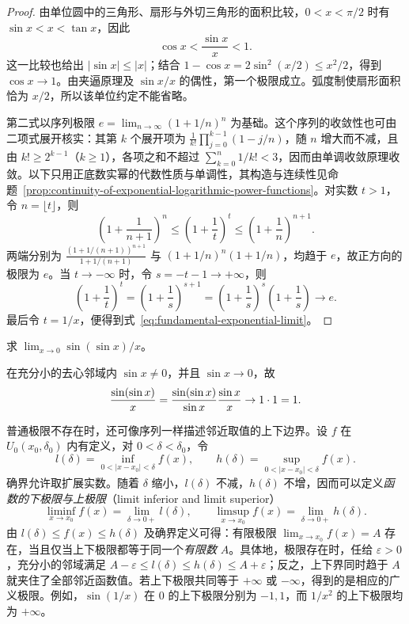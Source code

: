 \documentclass[UTF8,12pt,a4paper,fontset=fandol]{ctexbook}
\begin{document}
\begin{proof}
由单位圆中的三角形、扇形与外切三角形的面积比较，$0<x<\pi/2$ 时有 $\sin x<x<\tan x$，因此
\[
    \cos x<\frac{\sin x}{x}<1.
\]
这一比较也给出 $|\sin x|\leq|x|$；结合 $1-\cos x=2\sin^2(x/2)\leq x^2/2$，得到 $\cos x\to1$。由夹逼原理及 $\sin x/x$ 的偶性，第一个极限成立。弧度制使扇形面积恰为 $x/2$，所以该单位约定不能省略。

第二式以序列极限 $e=\lim_{n\to\infty}(1+1/n)^n$ 为基础。这个序列的收敛性也可由二项式展开核实：其第 $k$ 个展开项为 $\frac1{k!}\prod_{j=0}^{k-1}(1-j/n)$，随 $n$ 增大而不减，且由 $k!\geq2^{k-1}$（$k\geq1$），各项之和不超过 $\sum_{k=0}^n1/k!<3$，因而由单调收敛原理收敛。以下只用正底数实幂的代数性质与单调性，其构造与连续性见命题~\ref{prop:continuity-of-exponential-logarithmic-power-functions}。对实数 $t>1$，令 $n=\lfloor t\rfloor$，则
\[
    \left(1+\frac1{n+1}\right)^n
    \leq\left(1+\frac1t\right)^t
    \leq\left(1+\frac1n\right)^{n+1}.
\]
两端分别为 $\frac{(1+1/(n+1))^{n+1}}{1+1/(n+1)}$ 与 $(1+1/n)^n(1+1/n)$，均趋于 $e$，故正方向的极限为 $e$。当 $t\to-\infty$ 时，令 $s=-t-1\to+\infty$，则
\[
    \left(1+\frac1t\right)^t
    =\left(1+\frac1s\right)^{s+1}
    =\left(1+\frac1s\right)^s\left(1+\frac1s\right)\to e.
\]
最后令 $t=1/x$，便得到式~\eqref{eq:fundamental-exponential-limit}。
\end{proof}

\begin{example}
\label{ex:fundamental-trigonometric-limit-use}
求 $\lim_{x\to0}\sin(\sin x)/x$。
\end{example}

\begin{solve}
在充分小的去心邻域内 $\sin x\neq0$，并且 $\sin x\to0$，故
\[
    \frac{\sin(\sin x)}x
    =\frac{\sin(\sin x)}{\sin x}\frac{\sin x}x\to1\cdot1=1.
    \qedhere
\]
\end{solve}

普通极限不存在时，还可像序列一样描述邻近取值的上下边界。设 $f$ 在 $U_0(x_0,\delta_0)$ 内有定义，对 $0<\delta<\delta_0$，令
\[
    l(\delta)=\inf_{0<|x-x_0|<\delta}f(x),
    \qquad h(\delta)=\sup_{0<|x-x_0|<\delta}f(x).
\]
确界允许取扩展实数。随着 $\delta$ 缩小，$l(\delta)$ 不减，$h(\delta)$ 不增，因而可以定义\emph{函数的下极限与上极限}（limit inferior and limit superior）
\begin{equation}
    \liminf_{x\to x_0}f(x)=\lim_{\delta\to0+}l(\delta),
    \qquad
    \limsup_{x\to x_0}f(x)=\lim_{\delta\to0+}h(\delta).
    \label{eq:function-liminf-limsup}
\end{equation}
由 $l(\delta)\leq f(x)\leq h(\delta)$ 及确界定义可得：有限极限 $\lim_{x\to x_0}f(x)=A$ 存在，当且仅当上下极限都等于同一个\emph{有限数} $A$。具体地，极限存在时，任给 $\varepsilon>0$，充分小的邻域满足 $A-\varepsilon\leq l(\delta)\leq h(\delta)\leq A+\varepsilon$；反之，上下界同时趋于 $A$ 就夹住了全部邻近函数值。若上下极限共同等于 $+\infty$ 或 $-\infty$，得到的是相应的广义极限。例如，$\sin(1/x)$ 在 $0$ 的上下极限分别为 $-1,1$，而 $1/x^2$ 的上下极限均为 $+\infty$。
\end{document}
